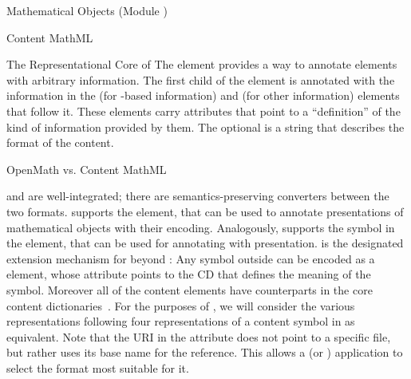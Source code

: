 \begin{tchapter}[id=mobj,short=Mathematical Objects]{Mathematical Objects (Module {})}
\begin{tsection}[id=cmml]{Content MathML}
\begin{tsubsection}[id=mathml-core]{The Representational Core of {\cmathml}}
The {} element provides a way to annotate {\cmathml} elements
with arbitrary information. The first child of the {} element
is annotated with the information in the {} (for
{\xml}-based information) and {} (for other information)
elements that follow it. These elements carry
{} attributes that point to a
``definition'' of the kind of information provided by them. The optional
{} is a string that describes the format of the
content.
\end{tsubsection}

\begin{tsubsection}[id=omvscmml]{OpenMath vs. Content MathML}

  {\openmath} and {\mathml} are well-integrated; there are semantics-preserving converters
  between the two formats. {\mathml} supports the {} element,
  that can be used to annotate {\mathml} presentations of mathematical objects with their
  {\openmath} encoding. Analogously, {\openmath} supports the {}
  symbol in the {} element, that can be used for annotating
  with {\mathml} presentation. {\openmath} is the designated extension mechanism for
  {\mathml} beyond {}: Any symbol outside can be encoded as a
  {} element, whose
  {} attribute points to the {\openmath} CD
  that defines the meaning of the symbol. Moreover all of the {\mathml} content elements
  have counterparts in the {\openmath} core content dictionaries~\cite{URL:omcd-core}. For the purposes of {\omdoc}, we will consider the
  various representations following four representations of a content symbol in
  {} as equivalent.  Note that the URI in the
  {} attribute does not point to a specific
  file, but rather uses its base name for the reference.  This allows a {\mathml} (or
  {\omdoc}) application to select the format most suitable for it.



\end{tsubsection}
\end{tsection}
\end{tchapter}
